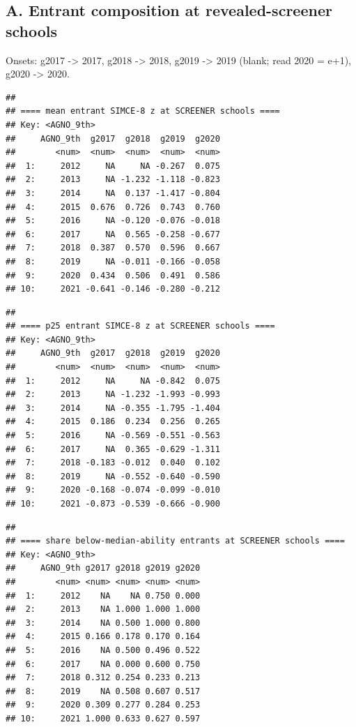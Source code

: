 \documentclass[
]{article}
\begin{document}
\hypertarget{a.-entrant-composition-at-revealed-screener-schools}{%
\subsection{A. Entrant composition at revealed-screener
schools}\label{a.-entrant-composition-at-revealed-screener-schools}}

Onsets: g2017 -\textgreater{} 2017, g2018 -\textgreater{} 2018, g2019
-\textgreater{} 2019 (blank; read 2020 = e+1), g2020 -\textgreater{}
2020.

\begin{verbatim}
## 
## ==== mean entrant SIMCE-8 z at SCREENER schools ====
## Key: <AGNO_9th>
##     AGNO_9th  g2017  g2018  g2019  g2020
##        <num>  <num>  <num>  <num>  <num>
##  1:     2012     NA     NA -0.267  0.075
##  2:     2013     NA -1.232 -1.118 -0.823
##  3:     2014     NA  0.137 -1.417 -0.804
##  4:     2015  0.676  0.726  0.743  0.760
##  5:     2016     NA -0.120 -0.076 -0.018
##  6:     2017     NA  0.565 -0.258 -0.677
##  7:     2018  0.387  0.570  0.596  0.667
##  8:     2019     NA -0.011 -0.166 -0.058
##  9:     2020  0.434  0.506  0.491  0.586
## 10:     2021 -0.641 -0.146 -0.280 -0.212
\end{verbatim}

\begin{verbatim}
## 
## ==== p25 entrant SIMCE-8 z at SCREENER schools ====
## Key: <AGNO_9th>
##     AGNO_9th  g2017  g2018  g2019  g2020
##        <num>  <num>  <num>  <num>  <num>
##  1:     2012     NA     NA -0.842  0.075
##  2:     2013     NA -1.232 -1.993 -0.993
##  3:     2014     NA -0.355 -1.795 -1.404
##  4:     2015  0.186  0.234  0.256  0.265
##  5:     2016     NA -0.569 -0.551 -0.563
##  6:     2017     NA  0.365 -0.629 -1.311
##  7:     2018 -0.183 -0.012  0.040  0.102
##  8:     2019     NA -0.552 -0.640 -0.590
##  9:     2020 -0.168 -0.074 -0.099 -0.010
## 10:     2021 -0.873 -0.539 -0.666 -0.900
\end{verbatim}

\begin{verbatim}
## 
## ==== share below-median-ability entrants at SCREENER schools ====
## Key: <AGNO_9th>
##     AGNO_9th g2017 g2018 g2019 g2020
##        <num> <num> <num> <num> <num>
##  1:     2012    NA    NA 0.750 0.000
##  2:     2013    NA 1.000 1.000 1.000
##  3:     2014    NA 0.500 1.000 0.800
##  4:     2015 0.166 0.178 0.170 0.164
##  5:     2016    NA 0.500 0.496 0.522
##  6:     2017    NA 0.000 0.600 0.750
##  7:     2018 0.312 0.254 0.233 0.213
##  8:     2019    NA 0.508 0.607 0.517
##  9:     2020 0.309 0.277 0.284 0.253
## 10:     2021 1.000 0.633 0.627 0.597
\end{verbatim}
\end{document}
